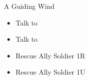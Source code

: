 \begin{battle}{A Guiding Wind}
\begin{enumerate}
{\begin{itemize}
    \end{itemize}
    \begin{itemize}
        \item Talk to \astrid
    \end{itemize}
    \astridf
    \begin{itemize}
        \item Talk to \gatrie
        \item Rescue Ally Soldier 1R
    \end{itemize}
    \begin{itemize}
        \item Rescue Ally Soldier 1U
    \end{itemize}
}
\end{enumerate}
\end{battle}

